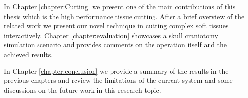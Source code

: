 In Chapter \ref{chapter:Cutting} we present one of the main contributions of this thesis which is the high 
performance tissue cutting. After a brief overview of the related work we present our novel technique 
in cutting complex soft tissues interactively. Chapter \ref{chapter:evaluation} showcases a skull craniotomy 
simulation scenario and provides comments on the operation itself and the achieved results.

In Chapter \ref{chapter:conclusion} we provide a summary of the results in the previous chapters and 
review the limitations of the current system and some discussions on the future work in this research topic.















